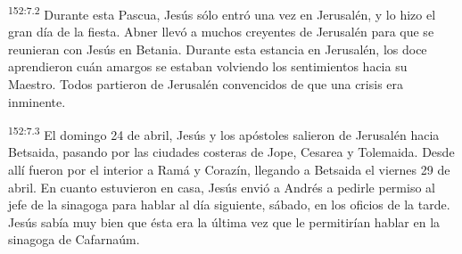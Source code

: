 \par
\textsuperscript{152:7.2} Durante esta Pascua, Jesús sólo entró una vez en Jerusalén, y lo hizo el gran día de la fiesta. Abner llevó a muchos creyentes de Jerusalén para que se reunieran con Jesús en Betania. Durante esta estancia en Jerusalén, los doce aprendieron cuán amargos se estaban volviendo los sentimientos hacia su Maestro. Todos partieron de Jerusalén convencidos de que una crisis era inminente.

\par
\textsuperscript{152:7.3} El domingo 24 de abril, Jesús y los apóstoles salieron de Jerusalén hacia Betsaida, pasando por las ciudades costeras de Jope, Cesarea y Tolemaida. Desde allí fueron por el interior a Ramá y Corazín, llegando a Betsaida el viernes 29 de abril. En cuanto estuvieron en casa, Jesús envió a Andrés a pedirle permiso al jefe de la sinagoga para hablar al día siguiente, sábado, en los oficios de la tarde. Jesús sabía muy bien que ésta era la última vez que le permitirían hablar en la sinagoga de Cafarnaúm.